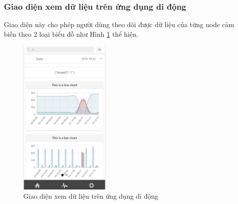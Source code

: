 \subsubsection*{Giao diện xem dữ liệu trên ứng dụng di động}
Giao diện này cho phép người dùng theo dõi được dữ liệu của từng node cảm biến theo 2 loại biểu đồ như Hình \ref{fig:app_graph} thể hiện.
\begin{center}
\begin{figure}[htp]
\centering    
\includegraphics[width=0.4\textwidth]{app_graph}
\caption[Giao diện xem dữ liệu trên ứng dụng di động]{Giao diện xem dữ liệu trên ứng dụng di động}
\label{fig:app_graph}
\end{figure}
\end{center}


